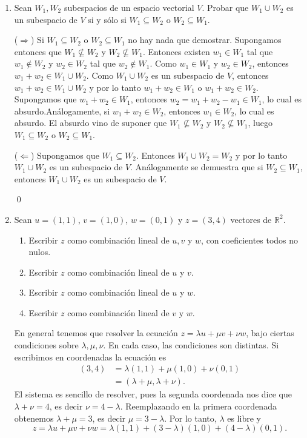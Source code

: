 \begin{enumerate}[resume, topsep=6pt, itemsep=.4cm]
    \item Sean $W_1, W_2$ subespacios de un espacio vectorial $V$. Probar que $W_1 \cup W_2$ es un subespacio  de $V$ si y sólo si $W_1 \subseteq W_2$ o $W_2 \subseteq W_1$.
        
    
    \rta 

    ($\Rightarrow$)  Si $W_1 \subseteq W_2$ o $W_2 \subseteq W_1$ no hay nada que demostrar. Supongamos entonces que $W_1 \not\subseteq W_2$ y $W_2 \not\subseteq W_1$. Entonces existen $w_1\in W_1$ tal que $w_1\not\in W_2$ y $w_2\in W_2$ tal que $w_2\not\in W_1$. Como $w_1\in W_1$ y $w_2\in W_2$, entonces $w_1+w_2\in W_1\cup W_2$. Como $W_1 \cup W_2$ es un subespacio  de $V$, entonces $w_1+w_2\in W_1\cup W_2$ y por lo tanto $w_1+w_2\in W_1$ o $w_1+w_2\in W_2$. Supongamos que $w_1+w_2\in W_1$, entonces $w_2=w_1+w_2-w_1\in W_1$, lo cual es absurdo.Análogamente,  si $w_1+w_2\in W_2$, entonces $w_1\in W_2$, lo cual es absurdo. El absurdo vino de suponer que $W_1 \not\subseteq W_2$ y $W_2 \not\subseteq W_1$, luego $W_1 \subseteq W_2$ o $W_2 \subseteq W_1$.

    ($\Leftarrow$) Supongamos que $W_1 \subseteq W_2$. Entonces $W_1 \cup W_2 = W_2$ y por lo tanto $W_1 \cup W_2$ es un subespacio  de $V$. Análogamente se demuestra que si $W_2 \subseteq W_1$, entonces $W_1 \cup W_2$ es un subespacio  de $V$.

    \qed     
        
    \item Sean $u=(1,1)$, $v=(1,0)$, $w=(0,1)$ y $z=(3,4)$ vectores de $\mathbb{R}^2$.
    \begin{enumerate}
    \item\label{comb-lin-u-v-w} Escribir $z$ como combinación lineal de $u,v$ y $w$, con coeficientes todos no nulos.
    \item\label{comb-lin-u-v} Escribir $z$ como combinación lineal de $u$ y $v$.
    \item\label{comb-lin-u-w} Escribir $z$ como combinación lineal de $u$ y $w$.
    \item\label{comb-lin-v-w}Escribir $z$ como combinación lineal de $v$ y $w$.
    \end{enumerate}
    
    \rta En general tenemos que resolver la ecuación $z=\lambda u+\mu v+\nu w$, bajo ciertas condiciones sobre $\lambda,\mu,\nu$. En cada caso, las condiciones son distintas. Si escribimos en coordenadas la ecuación es
    \begin{align*}
        (3,4)&=\lambda (1,1)+\mu (1,0)+\nu (0,1)\\
        &=(\lambda+\mu,\lambda+\nu).    \tag{*}
    \end{align*}
    El sistema es sencillo de resolver, pues la segunda coordenada nos dice que $\lambda+\nu=4$, es decir $\nu=4-\lambda$. Reemplazando en la primera coordenada obtenemos $\lambda+\mu=3$, es decir $\mu=3-\lambda$. Por lo tanto, $\lambda$ es libre y
    \begin{equation*}
        z=\lambda u+\mu v+\nu w=\lambda (1,1)+(3-\lambda) (1,0)+(4-\lambda) (0,1).
    \end{equation*}
    

\end{enumerate}
